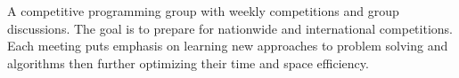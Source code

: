 \begin{resume}
  \begin{position}
    A competitive programming group with weekly competitions and group discussions. The goal is to prepare for nationwide and international competitions. Each meeting puts emphasis on learning new approaches to problem solving and algorithms then further optimizing their time and space efficiency.
  \end{position}



\end{resume}

